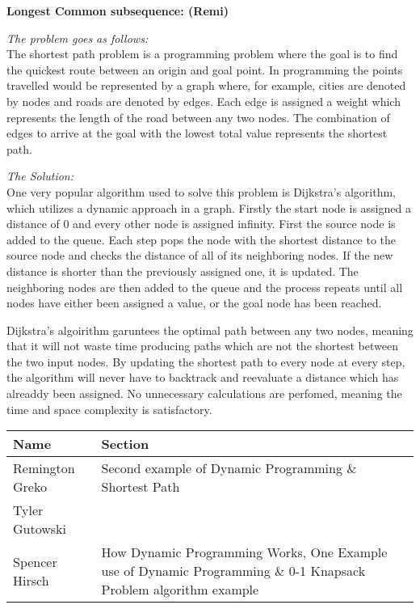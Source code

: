 \documentclass{article}
\begin{document}
\bigskip

\noindent \textbf{Longest Common subsequence: (Remi)} 

\noindent \textit{The problem goes as follows:} \\

The shortest path problem is a programming problem where the goal is to find 
the quickest route between an origin and goal point. In programming the points
travelled would be represented by a graph where, for example, cities are denoted
by nodes and roads are denoted by edges. Each edge is assigned a weight which 
represents the length of the road between any two nodes. The combination of edges 
to arrive at the goal with the lowest total value represents the shortest path.

\medskip

\noindent \textit{The Solution:} \\

One very popular algorithm used to solve this problem is Dijkstra's algorithm, 
which utilizes a dynamic approach in a graph. Firstly the start node is assigned 
a distance of 0 and every other node is assigned infinity. First the source node
is added to the queue. Each step pops the node with the shortest distance to the
source node and checks the distance of all of its neighboring nodes. If the 
new distance is shorter than the previously assigned one, it is updated. The 
neighboring nodes are then added to the queue and the process repeats until 
all nodes have either been assigned a value, or the goal node has been reached.

Dijkstra's algoirithm garuntees the optimal path between any two nodes, meaning 
that it will not waste time producing paths which are not the shortest between
the two input nodes. By updating the shortest path to every node at every step, 
the algorithm will never have to backtrack and reevaluate a distance which
has alreaddy been assigned. No unnecessary calculations are perfomed, meaning 
the time and space complexity is satisfactory.


\pagebreak

\begin{center}
        \begin{tabular}{|p{3cm}|p{6cm}|}
            \hline
            \textbf{Name} & \textbf{Section} \\
            \hline
            Remington Greko & Second example of Dynamic Programming $\&$ Shortest Path\\
            \hline
            Tyler Gutowski &  \\
            \hline
            Spencer Hirsch & How Dynamic Programming Works, One Example use of Dynamic Programming $\&$ 0-1 Knapsack Problem algorithm example \\
            \hline
        \end{tabular}
    \end{center}
    
\end{document}
